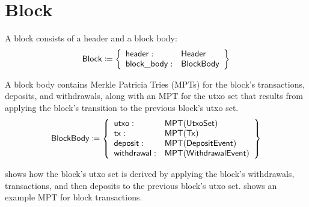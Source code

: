 \documentclass[../midgard.tex]{subfiles}
\begin{document}
\section{Block}
\label{h:block}

A block consists of a header and a block body:
\begin{equation*}
    \mathsf{Block} \coloneq \left\{
    \begin{array}{ll}
        \mathsf{header} : & \mathsf{Header} \\
        \mathsf{block\_body} : & \mathsf{BlockBody}
    \end{array} \right\}
\end{equation*}

A block body contains Merkle Patricia Tries (MPTs) for the block's transactions, deposits, and withdrawals, along with an MPT for the utxo set that results from applying the block's transition to the previous block's utxo set.
\begin{equation*}
    \mathsf{BlockBody} \coloneq \left\{
    \begin{array}{ll}
        \mathsf{utxo} : & \mathsf{MPT(UtxoSet)} \\
        \mathsf{tx} : & \mathsf{MPT(Tx)} \\
        \mathsf{deposit} : & \mathsf{MPT(DepositEvent)} \\
        \mathsf{withdrawal} : & \mathsf{MPT(WithdrawalEvent)} \\
    \end{array} \right\}
\end{equation*}

 shows how the block's utxo set is derived by applying the block's withdrawals, transactions, and then deposits to the previous block's utxo set.  shows an example MPT for block transactions.
\end{document}
